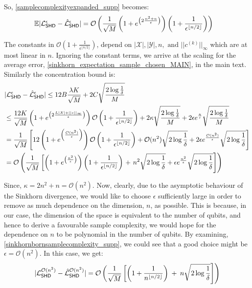 So, \eqref{samplecomplexityexpanded_supp} becomes:
\begin{align}
     &\mathbb{E}|\mathcal{L}_{\operatorname{\textsf{SHD}}}^\epsilon - \hat{\mathcal{L}}_{\operatorname{\textsf{SHD}}}^\epsilon| = \mathcal{O}\left(\frac{1}{\sqrt{M}}\left(1+e^{\left(2\frac{n^2+n}{\epsilon}\right)}\right)\left(1+\frac{1}{\epsilon^{\lfloor n/2\rfloor}}\right)\right)
\end{align}



\noindent The constants in $\mathcal{O}\left(1+\frac{1}{\epsilon^{\lfloor n/2\rfloor}}\right)$, depend on $|\mathcal{X}|, |\mathcal{Y}|, n, \text{ and } ||c^{(k)}||_\infty$ which are at most linear in $n$. Ignoring the constant terms, we arrive at the scaling for the average error, \eqref{sinkhorn_expectation_sample_chosen_MAIN}, in the main text. Similarly the concentration bound is: 
\begin{align}
    &|\mathcal{L}_{\operatorname{\textsf{SHD}}}^\epsilon - \hat{\mathcal{L}}_{\operatorname{\textsf{SHD}}}^\epsilon| \leq 12B\frac{\lambda K}{\sqrt{M}} + 2C\sqrt{\frac{2\log\frac{1}{\delta}}{M}}\\
    &\leq \frac{12K}{\sqrt{M}}\left(1+e^{\left(2\frac{L|\mathcal{X}|+||c||_{\infty}}{\epsilon}\right)}\right)\mathcal{O}\left(1+\frac{1}{\epsilon^{\lfloor n/2\rfloor}}\right)+ 2\kappa\sqrt{\frac{2\log\frac{1}{\delta}}{M}} + 2\epsilon e^{\frac{\kappa}{\epsilon}}\sqrt{\frac{2\log\frac{1}{\delta}}{M}}\\
    &= \frac{1}{\sqrt{M}}\left[12\left(1+e^{\left(\frac{\mathcal{O}(n^{2})}{\epsilon}\right)}\right)\mathcal{O}\left(1+\frac{1}{\epsilon^{\lfloor n/2\rfloor}}\right)+\mathcal{O}(n^{2})\sqrt{2\log\frac{1}{\delta}} + 2\epsilon e^{\frac{\mathcal{O}(n^{2})}{\epsilon}}\sqrt{2\log\frac{1}{\delta}}\right]\\
    &= \mathcal{O}\left(\frac{1}{\sqrt{M}}\left[\left(1+e^{\left(\frac{n^{2}}{\epsilon}\right)}\right)\left(1+\frac{1}{\epsilon^{\lfloor n/2\rfloor}}\right)\right.+ \left.n^{2}\sqrt{2\log\frac{1}{\delta}}  + \epsilon e^{\frac{n^{2}}{\epsilon}}\sqrt{2\log\frac{1}{\delta}}\right]\right) \label{sinkhornbornsamplecomplexity_supp}
\end{align}


Since, $\kappa = 2n^2+n = \mathcal{O}(n^{2})$. Now, clearly, due to the asymptotic behaviour of the Sinkhorn divergence, we would like to choose $\epsilon$ sufficiently large in order to remove as much dependence on the dimension, $n$, as possible. This is because, in our case, the dimension of the space is equivalent to the number of qubits, and hence to derive a favourable sample complexity, we would hope for the dependence on $n$ to be polynomial in the number of qubits. By examining, \eqref{sinkhornbornsamplecomplexity_supp}, we could see that a good choice might be $\epsilon = \mathcal{O}(n^{2})$. In this case, we get:
\begin{align}
    |\mathcal{L}_{\operatorname{\textsf{SHD}}}^{\mathcal{O}(n^{2})} - \hat{\mathcal{L}}_{\operatorname{\textsf{SHD}}}^{\mathcal{O}(n^{2})}| 
    = \mathcal{O}\left(\frac{1}{\sqrt{M}}\left[\left(1+\frac{1}{n^{\lfloor n/2\rfloor}}\right)\right.\right.+ \left.\left.n\sqrt{2\log\frac{1}{\delta}}\right]\right) \label{sinkhornbornsamplecomplexitychoosed_supp}
\end{align}



